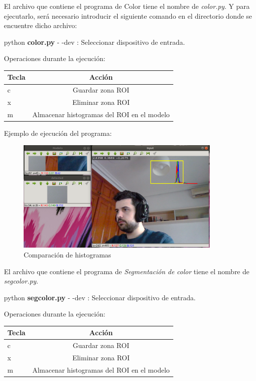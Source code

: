 \documentclass[a4paper]{article} %
\begin{document}
El archivo que contiene el programa de Color tiene el nombre de \textit{color.py}. Y para ejecutarlo, será necesario introducir el siguiente comando en el directorio donde se encuentre dicho archivo:
\\
\begin{tcolorbox}[collower=red!75!black]
python \textbf{color.py}
\tcblower
- -dev : Seleccionar dispositivo de entrada.
\end{tcolorbox}

\newpage
Operaciones durante la ejecución:

\begin{center}
    \begin{tabular}{ l | c }
      Tecla & Acción \\ \hline
      c & Guardar zona ROI \\
      x & Eliminar zona ROI \\
      m & Almacenar histogramas del ROI en el modelo \\
    \end{tabular}
\end{center}

Ejemplo de ejecución del programa:

\begin{figure}[htp]
	\centering
	\includegraphics[width=10cm]{imagenes/histo.png}
	\caption{Comparación de histogramas}
	\label{fig:hist}
\end{figure}

El archivo que contiene el programa de \textit{Segmentación de color} tiene el nombre de \textit{segcolor.py}.

\begin{tcolorbox}[collower=red!75!black]
	python \textbf{segcolor.py}
	\tcblower
	- -dev : Seleccionar dispositivo de entrada.
\end{tcolorbox}

Operaciones durante la ejecución:

\begin{center}
	\begin{tabular}{ l | c }
		Tecla & Acción \\ \hline
		c & Guardar zona ROI \\
		x & Eliminar zona ROI \\
		m & Almacenar histogramas del ROI en el modelo \\
	\end{tabular}
\end{center}
\end{document}
